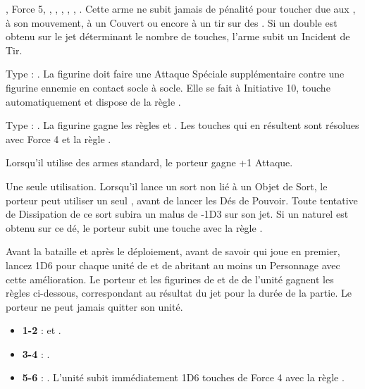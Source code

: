 \begin{multicols}{2}
\nopricelistitem{\naphthathrower} , Force 5,  \flamingattacks{}, \magicalattacks{}, , \volatile{}, \reload{}, .\vspace{2pt}\newline
Cette arme ne subit jamais de pénalité pour toucher due aux \multipleshots{}, à son mouvement, à un Couvert ou encore à un tir sur des \skirmishers{}. Si un double est obtenu sur le jet déterminant le nombre de touches, l'arme subit un Incident de Tir.

\endpricelist

\subtitle{Armes de Corps à Corps}

\startpricelist

\nopricelistitem{\plagueflail} Type : \flail{}. La figurine doit faire une Attaque Spéciale supplémentaire contre une figurine ennemie en contact socle à socle. Elle se fait à Initiative 10, touche automatiquement et dispose de la règle \toxicattacks{}.

\nopricelistitem{\meatgrinder} Type : \hw{}. La figurine gagne les règles  et . Les touches qui en résultent sont résolues avec Force 4 et la règle .

\endpricelist

\subtitle{Autres Équipements}

\startpricelist

\nopricelistitem{\tailweapon} Lorsqu'il utilise des armes standard, le porteur gagne +1 Attaque.

\nopricelistitem{\darkshard} Une seule utilisation. Lorsqu'il lance un sort non lié à un Objet de Sort, le porteur peut utiliser un seul \darkshard{}, avant de lancer les Dés de Pouvoir. Toute tentative de Dissipation de ce sort subira un malus de -1D3 sur son jet. Si un  naturel est obtenu sur ce dé, le porteur subit une touche avec la règle \toxicattacks{}.

\nopricelistitem{\darkshardbrew} Avant la bataille et après le déploiement, avant de savoir qui joue en premier, lancez 1D6 pour chaque unité de \ratsatarms{} et de \verminguard{} abritant au moins un Personnage avec cette amélioration. Le porteur et les figurines de \ratsatarms{} et de \verminguard{} de l'unité gagnent les règles ci-dessous, correspondant au résultat du jet pour la durée de la partie. Le porteur ne peut jamais quitter son unité.
\begin{itemize}[label={-}]
\item \textbf{1-2} : \poisonedattacks{} et \stupidity{}.
\item \textbf{3-4} : \thunderouscharge{}.
\item \textbf{5-6} : \lightningreflexes{}. L'unité subit immédiatement 1D6 touches de Force 4 avec la règle .
\end{itemize}

\endpricelist

\end{multicols}

